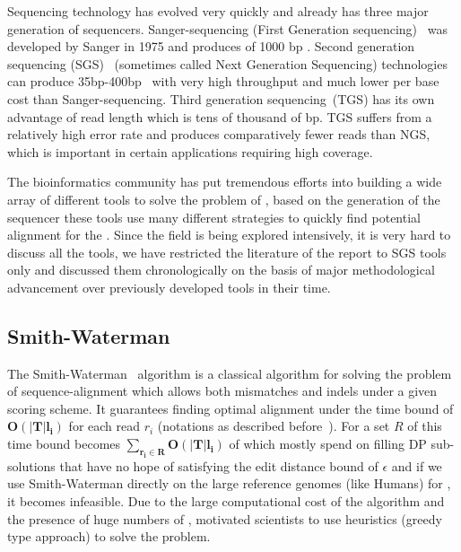 \bigbreak

Sequencing technology has evolved very quickly and already has three major generation of sequencers. Sanger-sequencing (First Generation sequencing)~\citep{sanger1975rapid} was developed by Sanger in 1975 and produces \reads of 1000 bp . Second generation sequencing (SGS)~\citep{reis2009next} (sometimes called Next Generation Sequencing) technologies can produce 35bp-400bp~\citep{schatz2010assembly} \reads with very high throughput and much lower per base cost than Sanger-sequencing. Third generation sequencing~\citep{schadt2010window}(TGS) has its own advantage of read length which is tens of thousand of bp. TGS suffers from a relatively high error rate and produces comparatively fewer reads than NGS, which is important in certain applications requiring high coverage. 

The bioinformatics community has put tremendous efforts into building a wide array of different tools to solve the problem of \ra, based on the generation of the sequencer these tools use many different strategies to quickly find potential alignment for the \reads. Since the field is being explored intensively, it is very hard to discuss all the tools, we have restricted the literature of the report to SGS tools only and discussed them chronologically on the basis of major methodological advancement over previously developed tools in their time.

\subsection{Smith-Waterman~\citep{smith1981identification}}
The Smith-Waterman~\citep{smith1981identification} algorithm is a classical algorithm for solving the problem of sequence-alignment which allows both mismatches and indels under a given scoring scheme. It guarantees finding optimal alignment under the time bound of $\bm{O(|T|l_i)}$ for each read $r_i$ (notations as described before~). For a set $R$ of \reads this time bound becomes $\bm{\sum_{r_i \in R}O(|T|l_i)}$ of which mostly spend on filling DP sub-solutions that have no hope of satisfying the edit distance bound of $\epsilon$ and if we use Smith-Waterman directly on the large reference genomes (like Humans) for \ra, it becomes infeasible. Due to the large computational cost of the algorithm and the presence of huge numbers of \reads, motivated scientists to use heuristics (greedy type approach) to solve the problem.

